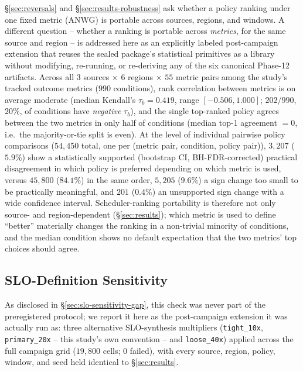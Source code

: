 \documentclass[sn-basic,Numbered,pdflatex]{sn-jnl}
\begin{document}
\S\ref{sec:reversals} and \S\ref{sec:results-robustness} ask whether a
policy ranking under one fixed metric (ANWG) is portable across sources,
regions, and windows. A different question -- whether a ranking is
portable across \emph{metrics}, for the same source and region -- is
addressed here as an explicitly labeled post-campaign extension that
reuses the sealed package's statistical primitives as a library without
modifying, re-running, or re-deriving any of the six canonical Phase-12
artifacts. Across all $3$ sources $\times$ $6$ regions $\times$ $55$
metric pairs among the study's tracked outcome metrics ($990$ conditions),
rank correlation between metrics is on average moderate (median Kendall's
$\tau_b = 0.419$, range $[-0.506, 1.000]$; $202/990$, $20\%$, of conditions
have \emph{negative} $\tau_b$), and the single top-ranked policy agrees
between the two metrics in only half of conditions (median top-1 agreement
$=0$, i.e.\ the majority-or-tie split is even). At the level of individual
pairwise policy comparisons ($54{,}450$ total, one per (metric pair,
condition, policy pair)), $3{,}207$ ($5.9\%$) show a statistically
supported (bootstrap CI, BH-FDR-corrected) practical disagreement in which
policy is preferred depending on which metric is used, versus $45{,}800$
($84.1\%$) in the same order, $5{,}205$ ($9.6\%$) a sign change too small
to be practically meaningful, and $201$ ($0.4\%$) an unsupported sign
change with a wide confidence interval. Scheduler-ranking portability is
therefore not only source- and region-dependent (\S\ref{sec:results});
which metric is used to define ``better'' materially changes the ranking
in a non-trivial minority of conditions, and the median condition shows no
default expectation that the two metrics' top choices should agree.

\subsection{SLO-Definition Sensitivity}
\label{sec:results-slo}

As disclosed in \S\ref{sec:slo-sensitivity-gap}, this check was never part
of the preregistered protocol; we report it here as the post-campaign
extension it was actually run as: three alternative SLO-synthesis
multipliers (\texttt{tight\_10x}, \texttt{primary\_20x} -- this study's own
convention -- and \texttt{loose\_40x}) applied across the full campaign
grid ($19{,}800$ cells; 0 failed), with every source, region, policy,
window, and seed held identical to \S\ref{sec:results}.
\end{document}
